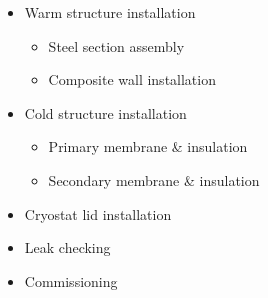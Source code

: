\begin{itemize}
\item Warm structure installation
  \begin{itemize}
  \item Steel section assembly
  \item  Composite wall installation
  \end{itemize}
\item Cold structure installation
  \begin{itemize}
  \item Primary membrane \& insulation
  \item  Secondary membrane \& insulation
  \end{itemize}
\item Cryostat lid installation
\item Leak checking
\item Commissioning
\end{itemize}


